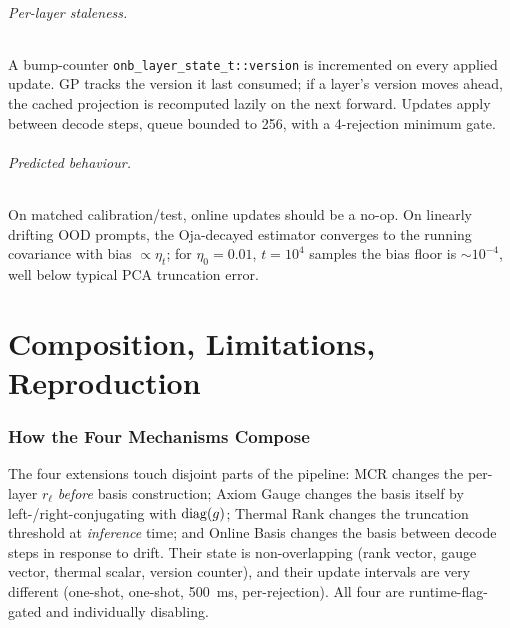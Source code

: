 \documentclass[11pt]{article}
\begin{document}
\paragraph{Per-layer staleness.}  A bump-counter
\texttt{onb\_layer\_state\_t::version} is incremented on every applied
update.  GP tracks the version it last consumed; if a layer's version
moves ahead, the cached projection is recomputed lazily on the next
forward.  Updates apply between decode steps, queue bounded to 256, with a
4-rejection minimum gate.

\paragraph{Predicted behaviour.}  On matched calibration/test, online
updates should be a no-op.  On linearly drifting OOD prompts, the
Oja-decayed estimator converges to the running covariance with bias
$\propto\eta_t$; for $\eta_0{=}0.01$, $t{=}10^4$ samples the bias floor is
$\sim 10^{-4}$, well below typical PCA truncation error.

\part{Composition, Limitations, Reproduction}

\section{How the Four Mechanisms Compose}
\label{sec:compose}
The four extensions touch disjoint parts of the pipeline:
MCR changes the per-layer $r_\ell$ \emph{before} basis construction;
Axiom Gauge changes the basis itself by left-/right-conjugating with
$\operatorname{diag}(g)$; Thermal Rank changes the truncation threshold at \emph{inference}
time; and Online Basis changes the basis between decode steps in response
to drift.  Their state is non-overlapping (rank vector, gauge vector,
thermal scalar, version counter), and their update intervals are very
different (one-shot, one-shot, 500~ms, per-rejection).  All four are
runtime-flag-gated and individually disabling.
\end{document}
